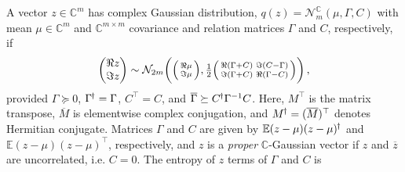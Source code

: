 \documentclass[a4paper,10pt,twocolumn]{article}
\newcommand{\cplx}{\mathbb{C}}
\newcommand{\hop}{{\mkern-1.5mu\dagger}}
\newcommand{\conj}[1]{\overline{#1}}
\begin{document}
A vector $z\in \cplx^m$ has complex Gaussian distribution, $
  q(z) = \mathcal{N}^{\cplx}_m(\mu, \Gamma, C)
$ with mean $\mu \in \cplx^m$ and $\cplx^{m\times m}$ covariance and relation matrices
$\Gamma$ and $C$, respectively, if
\begin{equation}  \label{eq:cn-paired-real-density}
  \begin{pmatrix}
    \Re z \\ \Im z
  \end{pmatrix}
    \sim \mathcal{N}_{2 m}\biggl(
      \Bigl(
        \begin{smallmatrix}
          \Re \mu \\ \Im \mu
        \end{smallmatrix}
      \Bigr),
      \tfrac12 \Bigl(
        \begin{smallmatrix}
          \Re{(\Gamma + C)} & \Im{(C - \Gamma)} \\
          \Im{(\Gamma + C)} & \Re{(\Gamma - C)}
        \end{smallmatrix}
      \Bigr)
    \biggr)
    \,,
\end{equation}
provided $\Gamma \succeq 0$, $\Gamma^{\hop} = \Gamma$, $C^\top = C$, and $
  \conj{\Gamma} \succeq C^{\hop} \Gamma^{-1} C
$.
Here, $M^{\top}$ is the matrix transpose, $\conj{M}$ is elementwise complex
conjugation, and $M^{\hop} = (\conj{M})^\top$ denotes Hermitian conjugate.
%
Matrices $\Gamma$ and $C$ are given by $
  \mathbb{E} (z - \mu)(z - \mu)^{\hop}
$ and $
  \mathbb{E} (z - \mu)(z - \mu)^{\top}
$, respectively, and $z$ is a \emph{proper} $\cplx$-Gaussian vector if $z$ and
$\conj{z}$ are uncorrelated, i.e. $C = 0$.
%
The entropy of $z$ terms of $\Gamma$ and $C$ is
\end{document}
